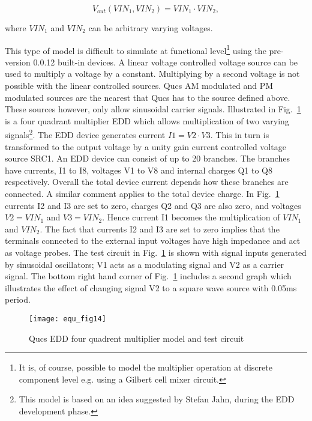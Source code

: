 \begin{equation}
V_{out}\left(VIN_1,VIN_2\right) = VIN_1\cdot VIN_2,
\end{equation}

where $VIN_1$ and $VIN_2$ can be arbitrary varying voltages.

\vspace{3mm}

This type of model is difficult to simulate at functional
level\footnote{It is, of course, possible to model the multiplier
operation at discrete component level e.g. using a Gilbert cell mixer
circuit.} using the pre-version 0.0.12 built-in devices.  A linear
voltage controlled voltage source can be used to multiply a voltage by
a constant.  Multiplying by a second voltage is not possible with the
linear controlled sources. Qucs AM modulated and PM modulated sources
are the nearest that Qucs has to the source defined above. These
sources however, only allow sinusoidal carrier signals.  Illustrated
in Fig.~\ref{fig:equ_14} is a four quadrant multiplier EDD which
allows multiplication of two varying signals\footnote{This model is
based on an idea suggested by Stefan Jahn, during the EDD development
phase.}. The EDD device generates current $I1 = V2\cdot V3$. This in
turn is transformed to the output voltage by a unity gain current
controlled voltage source SRC1. An EDD device can consist of up to 20
branches. The branches have currents, I1 to I8, voltages V1 to V8 and
internal charges Q1 to Q8 respectively. Overall the total device
current depends how these branches are connected. A similar comment
applies to the total device charge. In Fig.~\ref{fig:equ_14} currents
I2 and I3 are set to zero, charges Q2 and Q3 are also zero, and
voltages $V2=VIN_1$ and $V3=VIN_2$. Hence current I1 becomes the
multiplication of $VIN_1$ and $VIN_2$. The fact that currents I2 and
I3 are set to zero implies that the terminals connected to the
external input voltages have high impedance and act as voltage
probes. The test circuit in Fig.~\ref{fig:equ_14} is shown with signal
inputs generated by sinusoidal oscillators; V1 acts as a modulating
signal and V2 as a carrier signal. The bottom right hand corner of
Fig.~\ref{fig:equ_14} includes a second graph which illustrates the
effect of changing signal V2 to a square wave source with 0.05ms
period.


\begin{figure}[h]
  \centering
  \texttt{[image: equ\_fig14]}
  \caption{Qucs EDD four quadrent multiplier model and test circuit}
  \label{fig:equ_14}
\end{figure} 


